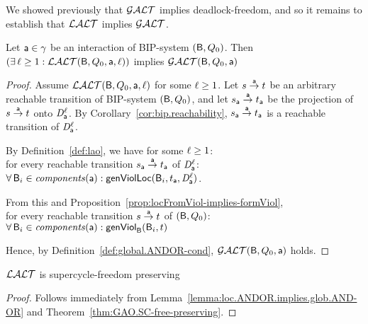 %
We showed previously that $\GAO$ implies deadlock-freedom, and so it remains to establish that $\LAO$ implies $\GAO$. 


\begin{lemma}
\label{lemma:loc.ANDOR.implies.glob.AND-OR}
\label{LAOGAO}
Let $\act \in \gamma$ be an interaction of BIP-system $(\B, Q_0)$. Then\\
\ind $(\ex \l \ge 1: \LAO(\B, Q_0, \act, \l))$ implies $\GAO(\B, Q_0, \act)$
\end{lemma}
%

\begin{proof}
Assume $\LAO(\B, Q_0, \act, \l)$ for some $\l \ge 1$. 
%
Let $s \goesto[\act] t$ be an arbitrary reachable transition of BIP-system $(\B, Q_0)$, and let 
$s_\act \goesto[\act] t_\act$ be the projection of $s \goesto[\act] t$ onto $\dsk{\act}{\l}$.
By Corollary~\ref{cor:bip.reachability}, $s_\act \goesto[\act] t_\act$ is a reachable transition of $\dsk{\act}{\l}$.

\noindent
By Definition~\ref{def:lao}, we have for some $\l \ge 1$:\\
\ind for every reachable transition $s_\act \goesto[\act] t_\act$ of $\dsk{\act}{\l}$:\\
\ind \ind $\fa \B_i \in \cmps{\act} : \locFormViol{\B_i}{t_\act}{\act}{\l}$.

\noindent
From this and Proposition~\ref{prop:locFromViol-implies-formViol},\\
\ind for every reachable transition $s \goesto[\act] t$ of  $(\B, Q_0)$:\\ 
\ind \ind $\fa \B_i \in \cmps{\act} : \formViol{\B_i}{t}$

\noindent
Hence, by Definition~\ref{def:global.ANDOR-cond}, $\GAO(\B, Q_0, \act)$ holds.
\end{proof}



\begin{theorem} \label{thm:LAO.SC-free-preserving}
$\LAO$ is supercycle-freedom preserving
\end{theorem}
%
\begin{proof}
Follows immediately from Lemma~\ref{lemma:loc.ANDOR.implies.glob.AND-OR} and Theorem~\ref{thm:GAO.SC-free-preserving}.
\end{proof}


